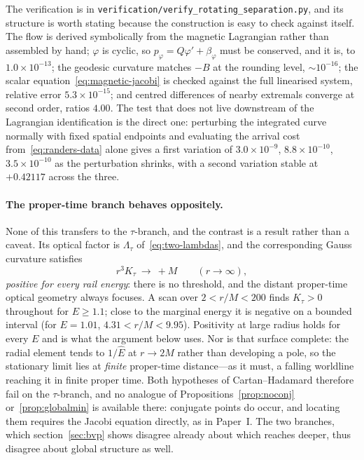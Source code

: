 \documentclass[12pt]{iopart}
\theoremstyle{plain}
\theoremstyle{definition}
\theoremstyle{remark}
\newcommand{\Ehat}{\hat E}
\begin{document}
The verification is in \texttt{verification/verify\_rotating\_separation.py},
and its structure is worth stating because the construction is easy to check
against itself. The flow is derived symbolically from the magnetic Lagrangian
rather than assembled by hand; $\varphi$ is cyclic, so $p_\varphi=Q\varphi'+\beta_\varphi$
must be conserved, and it is, to $1.0\times10^{-13}$; the geodesic curvature
matches $-B$ at the rounding level, $\sim10^{-16}$; the scalar
equation~\eqref{eq:magnetic-jacobi} is checked against the full linearised
system, relative error $5.3\times10^{-15}$; and centred differences of nearby
extremals converge at second order, ratios $4.00$. The test that does not live
downstream of the Lagrangian identification is the direct one: perturbing the
integrated curve normally with fixed spatial endpoints and evaluating the
arrival cost from~\eqref{eq:randers-data} alone gives a first variation of
$3.0\times10^{-9}$, $8.8\times10^{-10}$, $3.5\times10^{-10}$ as the perturbation
shrinks, with a second variation stable at $+0.42117$ across the three.

\paragraph{The proper-time branch behaves oppositely.} None of this transfers to
the $\tau$-branch, and the contrast is a result rather than a caveat. Its optical
factor is $\Lambda_\tau$ of~\eqref{eq:two-lambdas}, and the corresponding Gauss
curvature satisfies
\begin{equation}
    r^3K_\tau\ \longrightarrow\ +M \qquad (r\to\infty),
    \label{eq:ktau-asym}
\end{equation}
\emph{positive for every rail energy}: there is no threshold, and the distant
proper-time optical geometry always focuses. A scan over $2<r/M<200$ finds $K_\tau>0$
throughout for $E\ge1.1$; close to the marginal energy it is negative on a bounded
interval (for $E=1.01$, $4.31<r/M<9.95$). Positivity at large radius holds for every
$E$ and is what the argument below uses. Nor is that surface complete: the radial
element tends to $1/\Ehat$ at $r\to2M$ rather than developing a pole, so the
stationary limit lies at \emph{finite} proper-time distance---as it must, a
falling worldline reaching it in finite proper time. Both hypotheses of
Cartan--Hadamard therefore fail on the $\tau$-branch, and no analogue of
Propositions~\ref{prop:noconj} or~\ref{prop:globalmin} is available there:
conjugate points do occur, and locating them requires the Jacobi equation
directly, as in Paper~I. The two branches, which section~\ref{sec:bvp} shows
disagree already about which reaches deeper, thus disagree about global structure
as well.
\end{document}
